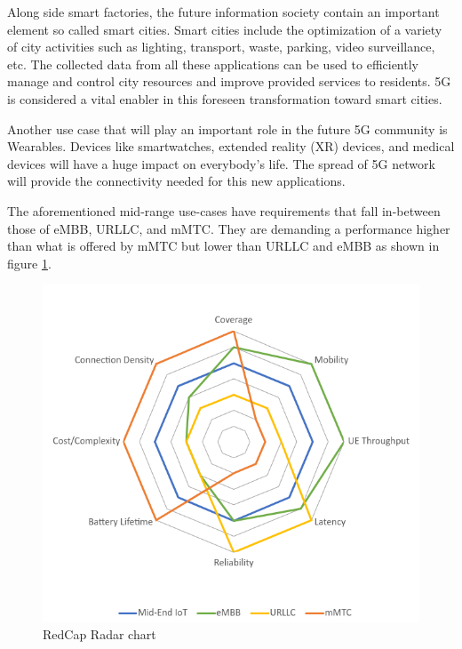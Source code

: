 \documentclass[conference]{IEEEtran}
\begin{document}
Along side smart factories, the future information society contain an important element so called smart cities. Smart cities include the optimization of a variety of city activities such as lighting, transport, waste, parking, video surveillance, etc. The collected data from all these applications  can be used to efficiently manage and control city resources and improve provided services to residents. 5G is considered a vital enabler in this foreseen transformation toward smart cities.

Another use case that will play an important role in the future 5G community is Wearables. Devices like smartwatches, extended reality (XR) devices, and medical devices will have a huge impact on everybody's life. The spread of 5G network will provide the connectivity needed for this new applications.

The aforementioned mid-range use-cases have requirements that fall in-between those of eMBB, URLLC, and mMTC. They are demanding a performance higher than what is offered by mMTC but lower than URLLC and eMBB as shown in figure \ref{fig:redcap-spider}.

\begin{figure}
    \centering
    \includegraphics[width=\linewidth]{Pictures/Radar Chart RedCap.png}    
    \caption{RedCap Radar chart}
    \label{fig:redcap-spider}
\end{figure}
\end{document}
